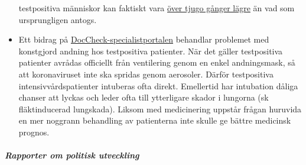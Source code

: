 \begin{itemize}
  testpositiva människor kan faktiskt vara
  \href{https://www.nytimes.com/2020/03/27/nyregion/new-rochelle-coronavirus.html}{över
  tjugo gånger lägre} än vad som ursprungligen antogs.
\item
  Ett bidrag på
  \href{https://www.doccheck.com/de/detail/articles/26271-covid-19-beatmung-und-dann}{DocCheck-specialistportalen}
  behandlar problemet med konstgjord andning hos testpositiva patienter.
  När det gäller testpositiva patienter avrådas officiellt från
  ventilering genom en enkel andningsmask, så att koronaviruset inte ska
  spridas genom aerosoler. Därför testpositiva intensivvårdspatienter
  intuberas ofta direkt. Emellertid har intubation dåliga chanser att
  lyckas och leder ofta till ytterligare skador i lungorna (sk
  fläktinducerad lungskada). Liksom med medicinering uppstår frågan
  huruvida en mer noggrann behandling av patienterna inte skulle ge
  bättre medicinsk prognos.
\end{itemize}

\hypertarget{rapporter-om-politisk-utveckling}{%
\subparagraph{\texorpdfstring{\textbf{Rapporter om politisk
utveckling}}{Rapporter om politisk utveckling}}\label{rapporter-om-politisk-utveckling}}

